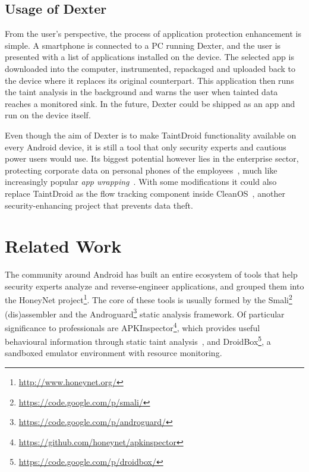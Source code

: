 \documentclass[12pt,twoside,notitlepage]{report}
\newcommand{\weblink}[1] {\footnote{\scriptsize\url{#1}}}
\begin{document}
\subsection{Usage of Dexter}


From the user's perspective, the process of application protection enhancement is simple. A smartphone is connected to a PC running Dexter, and the user is presented with a list of applications installed on the device. The selected app is downloaded into the computer, instrumented, repackaged and uploaded back to the device where it replaces its original counterpart. This application then runs the taint analysis in the background and warns the user when tainted data reaches a monitored sink. In the future, Dexter could be shipped as an app and run on the device itself.

Even though the aim of Dexter is to make TaintDroid functionality available on every Android device, it is still a tool that only security experts and cautious power users would use. Its biggest potential however lies in the enterprise sector, protecting corporate data on personal phones of the employees~\cite{web:BYOD}, much like increasingly popular \emph{app wrapping}~\cite{web:AppWrapping}. With some modifications it could also replace TaintDroid as the flow tracking component inside CleanOS~\cite{Tang:2012:CLM:2387880.2387888}, another security-enhancing project that prevents data theft.

\section{Related Work}

The community around Android has built an entire ecosystem of tools that help security experts analyze and reverse-engineer applications, and grouped them into the HoneyNet project\weblink{http://www.honeynet.org/}. The core of these tools is usually formed by the Smali\weblink{https://code.google.com/p/smali/} (dis)assembler and the Androguard\weblink{https://code.google.com/p/androguard/} static analysis framework. Of particular significance to professionals are APKInspector\weblink{https://github.com/honeynet/apkinspector}, which provides useful behavioural information through static taint analysis~\cite{2012kim_scandal}, and DroidBox\weblink{https://code.google.com/p/droidbox/}, a sandboxed emulator environment with resource monitoring. 
\end{document}
